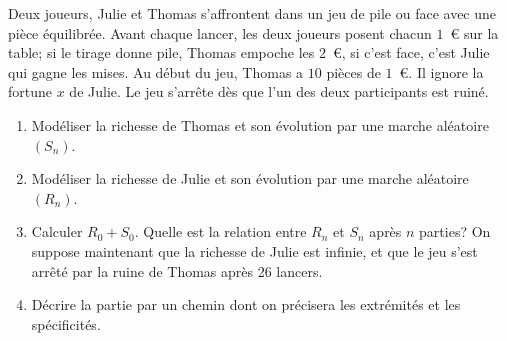 \documentclass[11pt]{td_um}
\begin{document}
\begin{exo}{} %
Deux joueurs, Julie et Thomas s'affrontent dans un jeu de pile ou face avec une pi\`ece équilibrée. Avant chaque lancer, les deux joueurs posent chacun $1$~\euro{} sur la table; si le tirage donne pile, Thomas empoche les $2$~\euro{}, si c'est face, c'est Julie qui gagne les mises. Au début du jeu, Thomas a $10$ pi\`eces de $1$~\euro{}. Il ignore la fortune $x$ de Julie. Le jeu s'arrête d\`es que l'un des deux participants est ruiné.
\begin{enumerate}
    \item  Modéliser la richesse de Thomas et son évolution par une marche aléatoire $(S_n)$.
    \item  Modéliser la richesse de Julie et son évolution par une marche aléatoire $(R_n)$.
    \item  Calculer $R_0+S_0$. Quelle est la relation entre $R_n$ et $S_n$ apr\`es $n$ parties?
        On suppose maintenant que la richesse de Julie est infinie, et que le jeu s'est arrêté par la ruine de Thomas apr\`es 26 lancers.
    \item  Décrire la partie par un chemin dont on précisera les extrémités et les spécificités.

\end{enumerate}
\end{exo}
\end{document}
